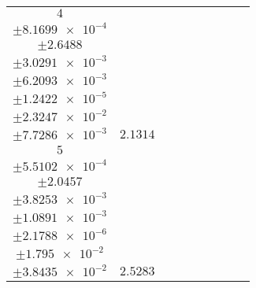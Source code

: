 \documentclass[8pt]{article}
\begin{document}
\begin{longtable}[l]{c c c c c c c c c}
$\num{4}$ & \begin{tabular}[c]{@{}c@{}}$\num{2.6894e-2}$ \\ $\pm\num{8.1699e-4}$\end{tabular} & \begin{tabular}[c]{@{}c@{}}$\num{0.90191}$ \\ $\pm\num{2.6488}$\end{tabular} & \begin{tabular}[c]{@{}c@{}}$\num{4.32}$ \\ $\pm\num{3.0291e-3}$\end{tabular} & \begin{tabular}[c]{@{}c@{}}$\num{4.0493e+3}$ \\ $\pm\num{6.2093e-3}$\end{tabular} & \begin{tabular}[c]{@{}c@{}}$\num{8.1008}$ \\ $\pm\num{1.2422e-5}$\end{tabular} & \begin{tabular}[c]{@{}c@{}}$\num{1.1363}$ \\ $\pm\num{2.3247e-2}$\end{tabular} & \begin{tabular}[c]{@{}c@{}}$\num{4.0988}$ \\ $\pm\num{7.7286e-3}$\end{tabular} & $\num{2.1314}$\\
$\num{5}$ & \begin{tabular}[c]{@{}c@{}}$\num{2.8863e-2}$ \\ $\pm\num{5.5102e-4}$\end{tabular} & \begin{tabular}[c]{@{}c@{}}$\num{0.81337}$ \\ $\pm\num{2.0457}$\end{tabular} & \begin{tabular}[c]{@{}c@{}}$\num{4.5564}$ \\ $\pm\num{3.8253e-3}$\end{tabular} & \begin{tabular}[c]{@{}c@{}}$\num{4.0495e+3}$ \\ $\pm\num{1.0891e-3}$\end{tabular} & \begin{tabular}[c]{@{}c@{}}$\num{8.1013}$ \\ $\pm\num{2.1788e-6}$\end{tabular} & \begin{tabular}[c]{@{}c@{}}$\num{1.1301}$ \\ $\pm\num{1.795e-2}$\end{tabular} & \begin{tabular}[c]{@{}c@{}}$\num{4.0007}$ \\ $\pm\num{3.8435e-2}$\end{tabular} & $\num{2.5283}$\\
\bottomrule
\end{longtable}
\end{document}
